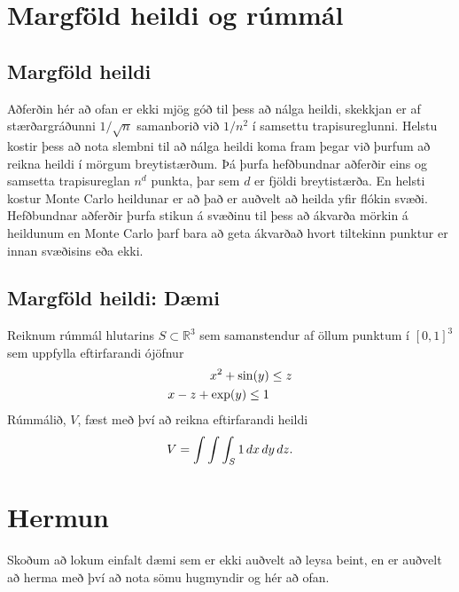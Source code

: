\documentclass[letterpaper,10pt,icelandic]{sphinxmanual}
\begin{document}
\section{Margföld heildi og rúmmál}
\label{kafli10:margfold-heildi-og-rummal}

\subsection{Margföld heildi}
\label{kafli10:margfold-heildi}
Aðferðin hér að ofan er ekki mjög góð til þess að nálga heildi, skekkjan er af stærðargráðunni
\(1/\sqrt n\) samanborið við \(1/n^2\) í samsettu trapisureglunni.
Helstu kostir þess að nota slembni til að nálga heildi koma fram þegar við þurfum að reikna
heildi í mörgum breytistærðum. Þá þurfa hefðbundnar aðferðir eins og samsetta trapisureglan
\(n^d\) punkta, þar sem \(d\) er fjöldi breytistærða.
En helsti kostur Monte Carlo heildunar er að það er auðvelt að heilda yfir flókin svæði. Hefðbundnar
aðferðir þurfa stikun á svæðinu til þess að ákvarða mörkin á heildunum en Monte Carlo þarf bara
að geta ákvarðað hvort tiltekinn punktur er innan svæðisins eða ekki.


\subsection{Margföld heildi: Dæmi}
\label{kafli10:margfold-heildi-daemi}
Reiknum rúmmál hlutarins \(S \subset \mathbb R^3\) sem samanstendur af öllum punktum í
\([0,1]^3\) sem uppfylla eftirfarandi ójöfnur
\begin{gather}
\begin{split}\begin{aligned}
x^2 + \sin(y) &\leq z \\
x-z+\exp(y) \leq 1
\end{aligned}\end{split}\notag
\end{gather}
Rúmmálið, \(V\), fæst með því að reikna eftirfarandi heildi
\begin{gather}
\begin{split}V = \int \int \int_S 1\, dx\, dy\, dz.\end{split}\notag
\end{gather}

\section{Hermun}
\label{kafli10:hermun}
Skoðum að lokum einfalt dæmi sem er ekki auðvelt að leysa beint, en er auðvelt að herma með því
að nota sömu hugmyndir og hér að ofan.
\end{document}
